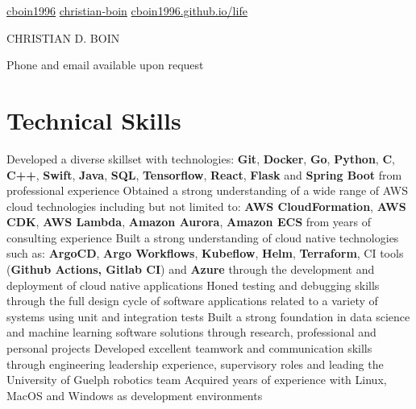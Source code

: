\documentclass[a4paper,11pt]{article}
\newcommand{\name}{CHRISTIAN D. BOIN} %
\newcommand{\github}{cboin1996} %
\newcommand{\linkedin}{christian-boin-masc-ai-6b705a135} %
\begin{document}
\selectfont


\newcommand{\iconspace}{0.4mm}
\newcommand{\headingsep}{1cm}
\begin{center}
	\small{\href{https://github.com/\github}{\faGithub \hspace{\iconspace} \github} \hspace{\headingsep}
		\href{https://www.linkedin.com/in/\linkedin/}{\faLinkedinSquare \hspace{\iconspace} christian-boin} \hspace{\headingsep}
		\href{https://cboin1996.github.io/life/}{\faFileCodeO \hspace{\iconspace} cboin1996.github.io/life}
	}
\end{center}
\begin{center}
	\vspace{-0.4cm}
	\huge{{\name}}
\end{center}
\begin{center}
	\vspace{-0.2cm}
	\tiny{
		Phone and email available upon request
	}
\end{center}
\section{Technical Skills}
\begin{entries}
	\ib Developed a diverse skillset with technologies: \textbf{Git}, \textbf{Docker}, \textbf{Go},
	\textbf{Python}, \textbf{C}, \textbf{C++}, \textbf{Swift}, \textbf{Java}, \textbf{SQL}, \textbf{Tensorflow}, \textbf{React},
	\textbf{Flask} and \textbf{Spring Boot} from professional experience
	\ib Obtained a strong understanding of a wide range of AWS cloud technologies including but not limited to:
        \textbf{AWS CloudFormation}, \textbf{AWS CDK}, \textbf{AWS Lambda},
        \textbf{Amazon Aurora}, \textbf{Amazon ECS} from years of consulting experience
	\ib Built a strong understanding of cloud native technologies such as: \textbf{ArgoCD}, \textbf{Argo Workflows},
	\textbf{Kubeflow}, \textbf{Helm},
	\textbf{Terraform}, CI tools (\textbf{Github Actions, Gitlab CI}) and \textbf{Azure} through the development and deployment
	of cloud native applications
	\ib Honed testing and debugging skills through the full design cycle of software applications related
	to a variety of systems using unit and integration tests
	\ib Built a strong foundation in data science and machine learning software solutions through
	research, professional and personal projects
	\ib Developed excellent teamwork and communication skills through engineering leadership experience,
	supervisory roles and leading the University of Guelph robotics team
	\ib Acquired years of experience with Linux, MacOS and Windows as development environments
\end{entries}
\end{document}
